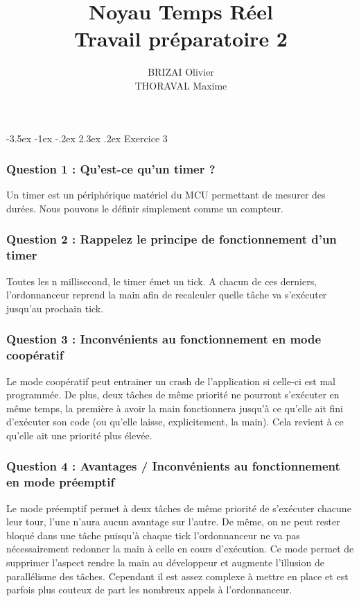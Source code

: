 \documentclass[a4paper,12pt]{article}
\makeatletter
\renewcommand\section{\@startsection {section}{1}{\z@}%
                           {-3.5ex \@plus -1ex \@minus -.2ex}%
                           {2.3ex \@plus.2ex}%
                           {\normalfont\Large\bfseries}}
\makeatother
\begin{document}
\newpage
\title{Noyau Temps Réel\\Travail préparatoire 2}
\date{}
\author{BRIZAI Olivier\\THORAVAL Maxime}
\maketitle

\section{Exercice 3}
\subsubsection{Question 1 : Qu'est-ce qu'un timer ?} 
Un timer est un périphérique matériel du MCU permettant de mesurer des durées. Nous pouvons le définir simplement comme un compteur.

\subsubsection{Question 2 : Rappelez le principe de fonctionnement d'un timer}
Toutes les n millisecond, le timer émet un tick. A chacun de ces derniers, l'ordonnanceur reprend la main afin de recalculer quelle tâche va s'exécuter jusqu'au prochain tick.

\subsubsection{Question 3 : Inconvénients au fonctionnement en mode coopératif}
Le mode coopératif peut entrainer un crash de l'application si celle-ci est mal programmée.
De plus, deux tâches de même priorité ne pourront s'exécuter en même temps, la première à avoir la main fonctionnera jusqu'à ce qu'elle ait fini d'exécuter son code (ou qu'elle laisse, explicitement, la main). Cela revient à ce qu'elle ait une priorité plus élevée.

\subsubsection{Question 4 : Avantages / Inconvénients au fonctionnement en mode préemptif}
Le mode préemptif permet à deux tâches de même priorité de s'exécuter chacune leur tour, l'une n'aura aucun avantage sur l'autre. De même, on ne peut rester bloqué dans une tâche puisqu'à chaque tick l'ordonnanceur ne va pas nécessairement redonner la main à celle en cours d'exécution.
Ce mode permet de supprimer l'aspect \og rendre la main \fg{} au développeur et augmente l'illusion de parallélisme des tâches.
Cependant il est assez complexe à mettre en place et est parfois plus couteux de part les nombreux appels à l'ordonnanceur.
\end{document}
